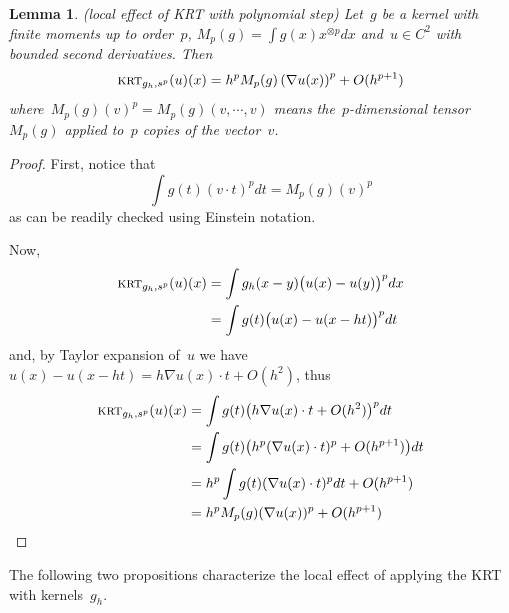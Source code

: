 \documentclass[12pt]{article}                  %
\newtheorem{lemma}{Lemma}
\begin{document}
\begin{lemma}(local effect of KRT with polynomial step)
	\label{lem:polystep}
	Let~$g$ be a kernel with finite moments up to order~$p$, $M_p(g)=\int
	g(x)x^{\otimes p}dx$ and~$u\in C^2$ with bounded second derivatives.  Then
\[
	\textsc{krt}_{g_h,s^p}(u)(x)=h^pM_p(g)\left(\nabla u(x)\right)^p  +
	O(h^{p+1})
\]
where~$M_p(g)(v)^p=M_p(g)(v,\cdots,v)$ means the~$p$-dimensional tensor~$M_p(g)$ applied
to~$p$ copies of the vector~$v$.
\end{lemma}

\begin{proof}
	First, notice that
	\[
		\int g(t)(v\cdot t)^pdt=M_p(g)(v)^p
	\]
	as can be readily checked using Einstein notation.

	Now,
	\begin{align*}
		\textsc{krt}_{g_h,s^p}(u)(x)
		&=\int g_h(x-y)\big(u(x)-u(y)\big)^pdx\\
		&=\int g(t)\big(u(x)-u(x-ht)\big)^pdt\\
	\end{align*}
	and, by Taylor expansion of~$u$ we have
	$u(x)-u(x-ht)=h\nabla u(x)\cdot t + O(h^2)$, thus
	\begin{align*}
		\textsc{krt}_{g_h,s^p}(u)(x)
		&=\int g(t)\big(h\nabla u(x)\cdot t+O(h^2)\big)^pdt\\
		&=\int g(t)\big(h^p(\nabla u(x)\cdot t)^p+O(h^{p+1})\big)dt\\
		&=h^p\int g(t)(\nabla u(x)\cdot t)^pdt + O(h^{p+1})\\
		&=h^pM_p(g)(\nabla u(x))^p+O(h^{p+1})
	\end{align*}
\end{proof}


The following two propositions characterize the local effect of applying the
KRT with kernels~$g_h$.

\end{document}
